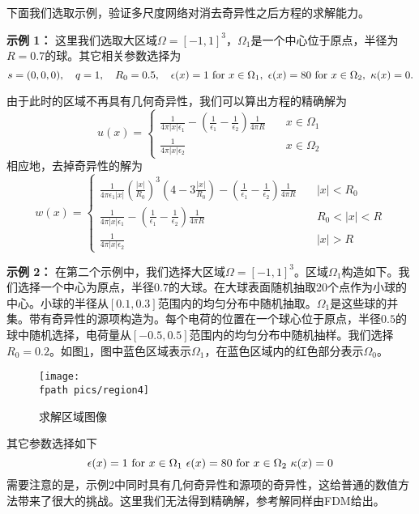 下面我们选取示例，验证多尺度网络对消去奇异性之后方程的求解能力。

\textbf{示例 1：}
这里我们选取大区域$\Omega = [-1,1]^3$，$\Omega_1$是一个中心位于原点，半径为$R = 0.7$的球。其它相关参数选择为
$$ s = (0,0,0), \quad q = 1, \quad R_0 = 0.5, \quad \epsilon(x) = 1 \ {\rm for}\ x\in\Omega_1, \ \epsilon(x) = 80 \ {\rm for}\ x\in\Omega_2,\ \kappa(x) = 0. $$

由于此时的区域不再具有几何奇异性，我们可以算出方程的精确解为
\begin{equation}
u(x) = \left\{
\begin{split}
\frac{1}{4\pi |x| \epsilon_1} - (\frac{1}{\epsilon_1} - \frac{1}{\epsilon_2}) \frac{1}{4\pi R} &\quad x\in\Omega_1 \\
\frac{1}{4\pi |x| \epsilon_2} &\quad x\in\Omega_2
\end{split}
\right.
\end{equation}
相应地，去掉奇异性的解为
\begin{equation}
w(x) = \left\{
\begin{split}
\frac{1}{4 \pi \epsilon_1 |x|} \left(\frac{|x|}{R_0}\right)^3 \left(4 - 3 \frac{|x|}{R_0} \right) - (\frac{1}{\epsilon_1} - \frac{1}{\epsilon_2}) \frac{1}{4\pi R} &\quad |x| < R_0 \\
\frac{1}{4\pi |x| \epsilon_1} - (\frac{1}{\epsilon_1} - \frac{1}{\epsilon_2}) \frac{1}{4\pi R} &\quad R_0 < |x| < R \\
\frac{1}{4\pi |x| \epsilon_2} &\quad |x| > R
\end{split}
\right.
\end{equation}

\textbf{示例 2：}
在第二个示例中，我们选择大区域$\Omega=[-1,1]^3$。区域$\Omega_1$构造如下。我们选择一个中心为原点，半径$0.7$的大球。在大球表面随机抽取20个点作为小球的中心。小球的半径从$[0.1, 0.3]$范围内的均匀分布中随机抽取。$\Omega_1$是这些球的并集。带有奇异性的源项构造为。每个电荷的位置在一个球心位于原点，半径$0.5$的球中随机选择，电荷量从$[-0.5,0.5]$范围内的均匀分布中随机抽样。我们选择$R_0=0.2$。如图\ref{reg}，图中蓝色区域表示$\Omega_1$，在蓝色区域内的红色部分表示$\Omega_0$。
\begin{figure}[htbp]
\centering
\texttt{[image: \\fpath pics/region4]}
\caption{求解区域图像}
\label{reg}
\end{figure}

其它参数选择如下
$$ \epsilon(x) = 1 \ {\rm for}\ x\in\Omega_1 \ \epsilon(x) = 80 \ {\rm for}\ x\in\Omega_2 \ \kappa(x) = 0 $$
需要注意的是，示例2中同时具有几何奇异性和源项的奇异性，这给普通的数值方法带来了很大的挑战。这里我们无法得到精确解，参考解同样由FDM给出。

